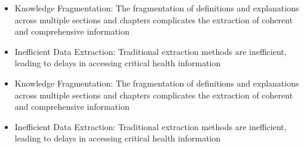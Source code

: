 \begin{itemize}
\item Knowledge Fragmentation: The fragmentation of definitions and explanations across multiple sections and chapters complicates the extraction of coherent and comprehensive information
\item Inefficient Data Extraction: Traditional extraction methods are inefficient, leading to delays in accessing critical health information
%
\end{itemize}
\begin{itemize}
\item Knowledge Fragmentation: The fragmentation of definitions and explanations across multiple sections and chapters complicates the extraction of coherent and comprehensive information
\item Inefficient Data Extraction: Traditional extraction methods are inefficient, leading to delays in accessing critical health information

\end{itemize}

